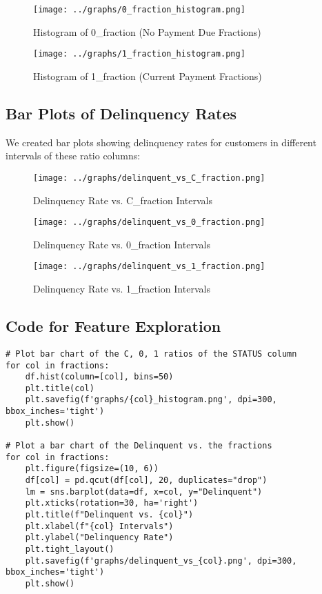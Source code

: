 \documentclass[12pt]{article}
\begin{document}
\begin{figure}[H]
    \centering
    \texttt{[image: ../graphs/0\_fraction\_histogram.png]}
    \caption{Histogram of 0\_fraction (No Payment Due Fractions)}
    \label{fig:0_hist}
\end{figure}

\begin{figure}[H]
    \centering
    \texttt{[image: ../graphs/1\_fraction\_histogram.png]}
    \caption{Histogram of 1\_fraction (Current Payment Fractions)}
    \label{fig:1_hist}
\end{figure}

\subsection{Bar Plots of Delinquency Rates}

We created bar plots showing delinquency rates for customers in different intervals of these ratio columns:

\begin{figure}[H]
    \centering
    \texttt{[image: ../graphs/delinquent\_vs\_C\_fraction.png]}
    \caption{Delinquency Rate vs. C\_fraction Intervals}
    \label{fig:c_delinquent}
\end{figure}

\begin{figure}[H]
    \centering
    \texttt{[image: ../graphs/delinquent\_vs\_0\_fraction.png]}
    \caption{Delinquency Rate vs. 0\_fraction Intervals}
    \label{fig:0_delinquent}
\end{figure}

\begin{figure}[H]
    \centering
    \texttt{[image: ../graphs/delinquent\_vs\_1\_fraction.png]}
    \caption{Delinquency Rate vs. 1\_fraction Intervals}
    \label{fig:1_delinquent}
\end{figure}

\subsection{Code for Feature Exploration}

\begin{verbatim}
# Plot bar chart of the C, 0, 1 ratios of the STATUS column
for col in fractions:
    df.hist(column=[col], bins=50)
    plt.title(col)
    plt.savefig(f'graphs/{col}_histogram.png', dpi=300, bbox_inches='tight')
    plt.show()

# Plot a bar chart of the Delinquent vs. the fractions
for col in fractions:
    plt.figure(figsize=(10, 6))
    df[col] = pd.qcut(df[col], 20, duplicates="drop")
    lm = sns.barplot(data=df, x=col, y="Delinquent")
    plt.xticks(rotation=30, ha='right')
    plt.title(f"Delinquent vs. {col}")
    plt.xlabel(f"{col} Intervals")
    plt.ylabel("Delinquency Rate")
    plt.tight_layout()
    plt.savefig(f'graphs/delinquent_vs_{col}.png', dpi=300, bbox_inches='tight')
    plt.show()
\end{verbatim}
\end{document}
